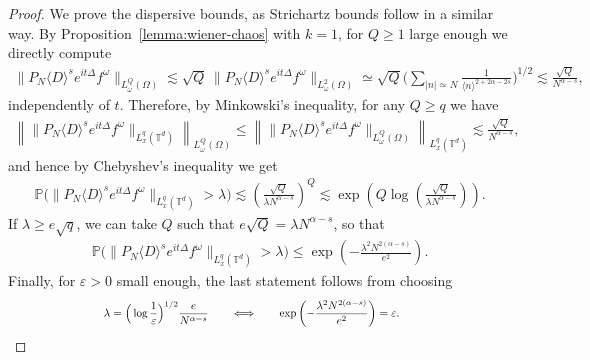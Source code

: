 \documentclass[11pt, xcolor = dvipsnames,reqno
]{amsart}
\theoremstyle{definition}
\theoremstyle{remark}
\begin{document}
\begin{proof}
    We prove the dispersive bounds, as Strichartz bounds follow in a similar way. 
    By Proposition~\ref{lemma:wiener-chaos} with $k = 1$, for $Q \geq 1$ large enough we directly compute 
    \begin{align} 
        \lVert P_N \langle D \rangle^s e^{it\Delta} f^\omega \rVert_{L^Q_{\omega}(\Omega)}
        \lesssim \sqrt{Q} \, 
        \lVert P_N \langle D \rangle^s e^{it\Delta} f^\omega \rVert_{L^2_{\omega}(\Omega)}
        \simeq \sqrt{Q} \bigg( \sum_{|n| \simeq N} \frac{1}{\langle n \rangle^{ 2 + 2\alpha  - 2s}} \bigg)^{1/2}
        \lesssim \frac{\sqrt Q}{N^{\alpha - s}},
    \end{align}
    independently of $t$. 
    Therefore, by Minkowski's inequality, 
    for any $Q \geq q$ we have
    \begin{align*}
        \left\| \lVert P_N \langle D \rangle^s e^{it\Delta} f^\omega \rVert_{L^q_x(\mathbb T^d)} \right\|_{L^Q_{\omega}(\Omega)} 
        \leq 
        \left\| \lVert P_N \langle D \rangle^s e^{it\Delta} f^\omega \rVert_{L^Q_{\omega}(\Omega)} \right\|_{L_x^q(\mathbb T^d)}
        \lesssim \frac{\sqrt Q}{N^{\alpha - s}},
    \end{align*}
    and hence by Chebyshev's inequality we get
    \begin{align*}
        \mathbb{P} \big(\lVert P_N \langle D \rangle^s e^{it\Delta} f^\omega \rVert_{L_x^q(\mathbb T^d)} > \lambda \big) 
        \lesssim \left( \frac{ \sqrt Q}{\lambda N^{\alpha - s}} \right)^Q 
        \lesssim \exp\left( Q \log\left( \frac{\sqrt Q}{\lambda N^{\alpha - s}} \right) \right).
    \end{align*}
    If $\lambda \geq e \sqrt q$, we can take $Q$ such that $ e \sqrt Q = \lambda N^{\alpha - s}$, so that
    \begin{align*}
        \mathbb{P} \big(\lVert P_N \langle D \rangle^s e^{it\Delta} f^\omega \rVert_{L_x^q(\mathbb T^d)} > \lambda \big) 
        \leq \exp\left(-\frac{\lambda^2 N^{2(\alpha - s)}}{ e^2}\right).
    \end{align*}
    Finally, for $\varepsilon  > 0$ small enough, the last statement follows from choosing 
    \begin{align}
        \hspace{3cm}
        \lambda = \Big( \log \frac{1}{\varepsilon} \Big)^{1/2} \frac{e}{N^{\alpha - s}} 
        \qquad \Longleftrightarrow \qquad
        \exp\left(-\frac{\lambda^2 N^{2(\alpha - s)}}{e^2}\right) = \varepsilon.
        \hspace{3.5cm}
        \qedhere
    \end{align}
\end{proof}
\end{document}
